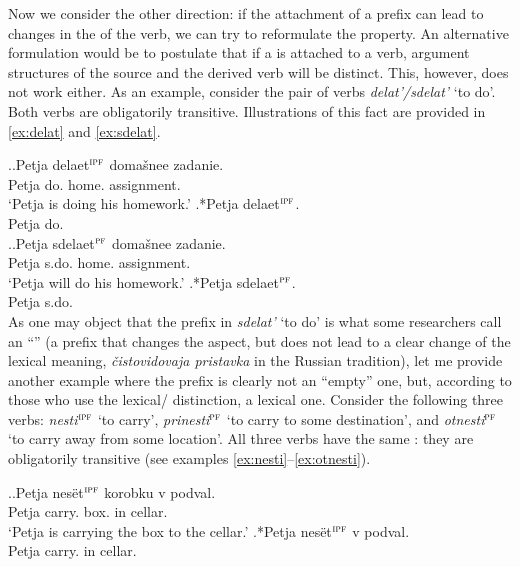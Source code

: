 Now we consider the other direction: if the attachment of a  prefix can lead to changes in the  of the  verb, we can try to reformulate the property. An alternative formulation would be to postulate that if a  is attached to a verb, argument structures of the source and the derived verb will be distinct. This, however, does not work either. As an example, consider the pair of verbs \textit{delat'/sdelat'} `to do'. Both verbs are obligatorily transitive. Illustrations of this fact are provided in \ref{ex:delat} and \ref{ex:sdelat}.

\ex.\label{ex:delat}\ag.Petja delaet$^{\textsc{ipf}}$ doma\v{s}nee zadanie.\\
Petja do. home. assignment.\\
\trans `Petja is doing his homework.'
\bg.*Petja delaet$^{\textsc{ipf}}$.\\
Petja do.\\

\ex.\label{ex:sdelat}\ag.Petja sdelaet$^{\textsc{pf}}$ doma\v{s}nee zadanie.\\
Petja s.do. home. assignment.\\
\trans `Petja will do his homework.'
\bg.*Petja sdelaet$^{\textsc{pf}}$.\\
Petja s.do.\\


As one may object that the prefix  in \textit{sdelat'} `to do' is what some researchers call an ``'' (a prefix that changes the aspect, but does not lead to a clear change of the lexical meaning, \textit{\v{c}istovidovaja pristavka} in the Russian tradition), let me provide another example where the prefix is clearly not an ``empty'' one, but, according to those who use the lexical/ distinction, a lexical one.  Consider the following three verbs: \textit{nesti}$^{\textsc{ipf}}$ `to carry', \textit{prinesti}$^{\textsc{pf}}$ `to carry to some destination',  and \textit{otnesti}$^{\textsc{pf}}$ `to carry away from some location'. All three verbs have the same : they are obligatorily transitive (see examples \ref{ex:nesti}--\ref{ex:otnesti}).

\ex.\label{ex:nesti}\ag.Petja nes\"{e}t$^{\textsc{ipf}}$ korobku v podval.\\
Petja carry. box. in cellar.\\
\trans `Petja is carrying the box to the cellar.'
\bg.*Petja nes\"{e}t$^{\textsc{ipf}}$ v podval.\\
Petja carry. in cellar.\\

